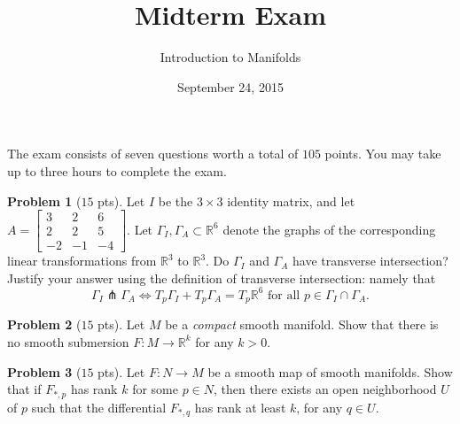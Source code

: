 \documentclass{amsart}
\newcommand{\+}[1]{\ensuremath{\mathbf{#1}}}
\newcommand{\R}{{\mathbb R}}
\theoremstyle{definition}
\newtheorem{prob}{Problem}
\begin{document}
\title{Midterm Exam}
\date{September 24, 2015}
\author{Introduction to Manifolds}

\maketitle


The exam consists of seven questions  worth a total of $105$ points.
You may take up to three hours to complete the exam.


\begin{prob}[$15$ pts]
Let $I$ be the $3 \times 3$ identity matrix, and let $A = \begin{bmatrix}
3 & 2 & 6 \\ 2 & 2 & 5 \\ -2 & -1 & -4 
\end{bmatrix}$.
Let $\Gamma_I, \Gamma_A \subset \R^6$ denote the graphs of the corresponding linear transformations from
$\R^3$ to $\R^3$.
Do $\Gamma_I$ and $\Gamma_A$ have transverse intersection?
Justify your answer using the definition of transverse intersection: namely that
\[\Gamma_I \pitchfork \Gamma_A \Longleftrightarrow T_p\Gamma_I + T_p\Gamma_A = T_p\R^6 \text{ for all } p \in \Gamma_I \cap \Gamma_A.\]
\end{prob}

\vspace{3mm}

\begin{prob}[$15$ pts]
Let $M$ be a \emph{compact} smooth manifold.  Show that there is no smooth submersion $F: M \to \R^k$ for any $k >0$.
\end{prob}


\vspace{3mm}

\begin{prob}[$15$ pts]
Let $F: N \to M$ be a smooth map of smooth manifolds.
Show that if $F_{*,p}$ has rank $k$ for some $p \in N$,
then there exists an open neighborhood $U$ of $p$ such that 
the differential $F_{*,q}$ has rank at least $k$, for any $q \in U$.
\end{prob}


\vspace{3mm}

\end{document}
